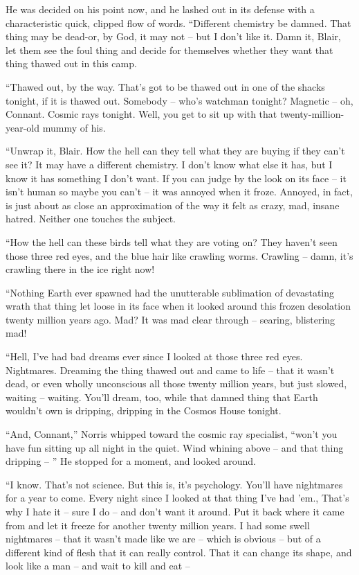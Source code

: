 \documentclass[letterpaper,openany,12pt]{memoir}		%
\begin{document}
He was decided on his point now, and he lashed out in its defense with a
characteristic quick, clipped flow of words. ``Different chemistry be damned.
That thing may be dead-or, by God, it may not -- but I don't like it. Damn it,
Blair, let them see the foul thing and decide for themselves whether they want
that thing thawed out in this camp.

``Thawed out, by the way. That's got to be thawed out in one of the shacks
tonight, if it is thawed out. Somebody -- who's watchman tonight? Magnetic --
oh, Connant. Cosmic rays tonight. Well, you get to sit up with that
twenty-million-year-old mummy of his.

``Unwrap it, Blair. How the hell can they tell what they are buying if they
can't see it? It may have a different chemistry. I don't know what else it has,
but I know it has something I don't want. If you can judge by the look on its
face -- it isn't human so maybe you can't -- it was annoyed when it froze.
Annoyed, in fact, is just about as close an approximation of the way it felt as
crazy, mad, insane hatred. Neither one touches the subject.

``How the hell can these birds tell what they are voting on? They haven't seen
those three red eyes, and the blue hair like crawling worms. Crawling -- damn,
it's crawling there in the ice right now!

``Nothing Earth ever spawned had the unutterable sublimation of devastating
wrath that thing let loose in its face when it looked around this frozen
desolation twenty million years ago. Mad? It was mad clear through -- searing,
blistering mad!

``Hell, I've had bad dreams ever since I looked at those three red eyes.
Nightmares. Dreaming the thing thawed out and came to life -- that it wasn't
dead, or even wholly unconscious all those twenty million years, but just
slowed, waiting -- waiting. You'll dream, too, while that damned thing that
Earth wouldn't own is dripping, dripping in the Cosmos House tonight.

``And, Connant,'' Norris whipped toward the cosmic ray specialist, ``won't you
have fun sitting up all night in the quiet. Wind whining above -- and that thing
dripping -- '' He stopped for a moment, and looked around.

``I know. That's not science. But this is, it's psychology. You'll have
nightmares for a year to come. Every night since I looked at that thing I've had
'em., That's why I hate it -- sure I do -- and don't want it around. Put it back
where it came from and let it freeze for another twenty million years. I had
some swell nightmares -- that it wasn't made like we are -- which is obvious --
but of a different kind of flesh that it can really control. That it can change
its shape, and look like a man -- and wait to kill and eat --
\end{document}
